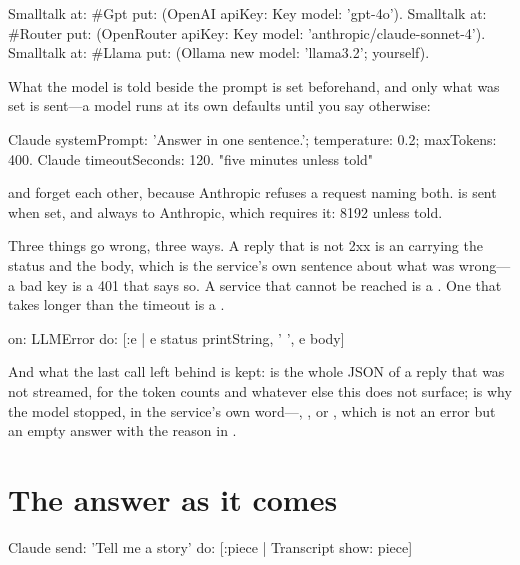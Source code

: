 \begin{st}
Smalltalk at: #Gpt put: (OpenAI apiKey: Key model: 'gpt-4o').
Smalltalk at: #Router put: (OpenRouter apiKey: Key model: 'anthropic/claude-sonnet-4').
Smalltalk at: #Llama put: (Ollama new model: 'llama3.2'; yourself).
\end{st}

What the model is told beside the prompt is set beforehand, and only what
was set is sent---a model runs at its own defaults until you say
otherwise:

\begin{st}
Claude systemPrompt: 'Answer in one sentence.'; temperature: 0.2; maxTokens: 400.
Claude timeoutSeconds: 120.                     "five minutes unless told"
\end{st}

 and  forget each other, because Anthropic
refuses a request naming both.  is sent when set, and
always to Anthropic, which requires it: 8192 unless told.

Three things go wrong, three ways. A reply that is not 2xx is an
 carrying the status and the body, which is the service's own
sentence about what was wrong---a bad key is a 401 that says so. A service
that cannot be reached is a . One that takes longer than the
timeout is a .

\begin{st}
 on: LLMError do: [:e | e status printString, ' ', e body]
\end{st}

And what the last call left behind is kept:  is the whole
JSON of a reply that was not streamed, for the token counts and whatever
else this does not surface;  is why the model stopped,
in the service's own word---, , or ,
which is not an error but an empty answer with the reason in
.

\section{The answer as it comes}

\begin{st}
Claude send: 'Tell me a story' do: [:piece | Transcript show: piece]
\end{st}

